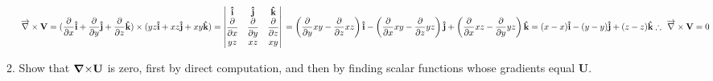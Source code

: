 \documentclass[fleqn]{article}
\newcommand{\grad}[1]{\mbox{\boldmath $\nabla$}\mbox{$#1$}}
\begin{document}
\begin{enumerate}
\begin{enumerate}
        \textcolor{hwColor}{
          $
            \overrightarrow{\nabla} \times \mathbf{V}=(\dfrac{\partial}{\partial x}\mathbf{\hat{i}}+\dfrac{\partial}{\partial y}\mathbf{\hat{j}}+\dfrac{\partial}{\partial z}\mathbf{\hat{k}}) \times (yz\mathbf{\hat{i}}+xz \mathbf{\hat{j}}+xy\mathbf{\hat{k}}) \\
            \\
            =\begin{vmatrix}
              \mathbf{\hat{i}} & \mathbf{\hat{j}} & \mathbf{\hat{k}} \\
              \dfrac{\partial}{\partial x} & \dfrac{\partial}{\partial y} & \dfrac{\partial}{\partial z} \\
              yz & xz & xy
            \end{vmatrix} \\
            =\left(\dfrac{\partial}{\partial y}xy-\dfrac{\partial}{\partial z}xz\right)\mathbf{\hat{i}}-\left(\dfrac{\partial}{\partial x}xy-\dfrac{\partial}{\partial z}yz\right)\mathbf{\hat{j}}+\left(\dfrac{\partial}{\partial x}xz-\dfrac{\partial}{\partial y}yz\right)\mathbf{\hat{k}} \\
            \\
            \\
            =(x-x)\mathbf{\hat{i}}-(y-y)\mathbf{\hat{j}}+(z-z)\mathbf{\hat{k}} \\
            \\
            \therefore ~ \overrightarrow{\nabla} \times \mathbf{V}=0
          $
        }
        
      \item Show that $\mathbf{\grad \times U}$ is zero, first by direct computation, and then by finding scalar functions whose gradients equal $\mathbf{U}$.
      

\end{enumerate}
\end{enumerate}
\end{document}

